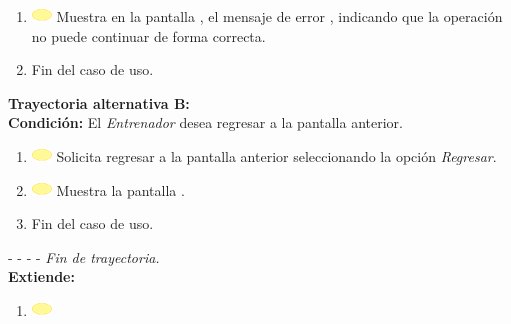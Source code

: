 \begin{enumerate}
	\item \includegraphics[width=15pt]{./Figuras/iconosCU/herramienta.png} Muestra en la pantalla , el mensaje de error , indicando que la operación no puede continuar de forma correcta.
	\item Fin del caso de uso.
\end{enumerate}

\textbf{\large{Trayectoria alternativa B:}}\\
\textbf{Condición: } El \textit{Entrenador} desea regresar a la pantalla anterior.

\begin{enumerate}
	\item \includegraphics[width=15pt]{./Figuras/iconosCU/herramienta.png} Solicita regresar a la pantalla anterior seleccionando la opción \textit{Regresar}.
	\item \includegraphics[width=15pt]{./Figuras/iconosCU/herramienta.png} Muestra la pantalla .
	\item Fin del caso de uso.
\end{enumerate}

- - - - \textit{Fin de trayectoria.} \\

\textbf{\large{Extiende:}}

\begin{enumerate}
	\item \includegraphics[width=15pt]{./Figuras/iconosCU/herramienta.png} 
\end{enumerate}

\clearpage